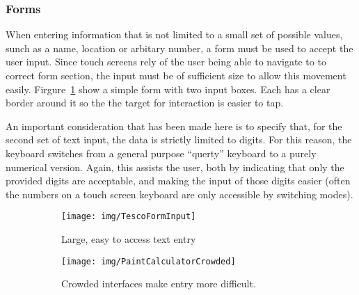 
\subsubsection{Forms}
\label{ssub:forms}

When entering information that is not limited to a small set of possible
values, sunch as a name, location or arbitary number, a form must be used to
accept the user input. Since touch screens rely of the user being able to
navigate to to correct form section, the input must be of sufficient size to
allow this movement easily. Firgure~\ref{fig:TescoFormInput} show a simple form
with two input boxes. Each has a clear border around it so the the target for
interaction is easier to tap.

An important consideration that has been made here is to specify that, for the
second set of text input, the data is strictly limited to digits. For this
reason, the keyboard switches from a general purpose ``querty'' keyboard to a
purely numerical version. Again, this assists the user, both by indicating that
only the provided digits are acceptable, and making the input of those digits
easier (often the numbers on a touch screen keyboard are only accessible by
switching modes).

\begin{figure}[ht]
    \centering
    \begin{subfigure}[b]{0.25\textwidth}
        \texttt{[image: img/TescoFormInput]}
        \caption{Large, easy to access text entry}\label{fig:TescoFormInput}
    \end{subfigure}%
    \qquad
    \begin{subfigure}[b]{0.3\textwidth}
        \texttt{[image: img/PaintCalculatorCrowded]}
        \caption{Crowded interfaces make entry more difficult.}
    \end{subfigure}
    \caption{}\label{fig:PaintCalculatorCrowded}
\end{figure}



